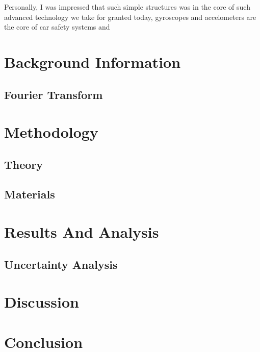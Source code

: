 \documentclass[a4paper,12pt]{article}
\begin{document}
    Personally, I was impressed that such simple structures was in the core of such advanced technology we take for granted today, gyroscopes and accelometers are the core of car safety systems and



\section{Background Information}%
    \subsection{Fourier Transform}

\section{Methodology}%
    \subsection{Theory}

    \subsection{Materials}


\section{Results And Analysis}%
    \subsection{Uncertainty Analysis}

\section{Discussion}%

\section{Conclusion}%

\printbibliography
\end{document}
